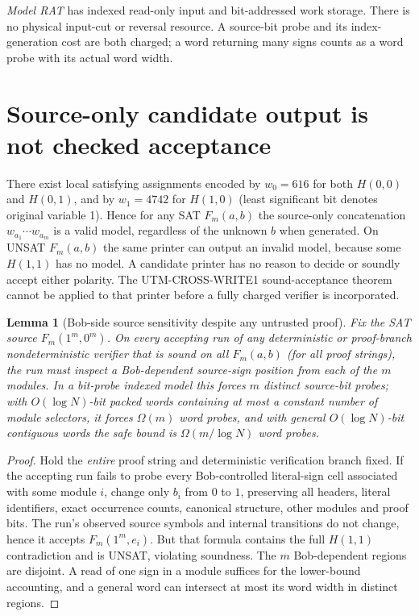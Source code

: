 \documentclass[11pt]{article}
\newtheorem{lemma}[theorem]{Lemma}
\begin{document}
\emph{Model RAT} has indexed read-only input and bit-addressed work storage. There is no physical input-cut or reversal resource. A source-bit probe and its index-generation cost are both charged; a word returning many signs counts as a word probe with its actual word width.

\section{Source-only candidate output is not checked acceptance}
There exist local satisfying assignments encoded by $w_0=616$ for both $H(0,0)$ and $H(0,1)$, and by $w_1=4742$ for $H(1,0)$ (least significant bit denotes original variable 1). Hence for any SAT $F_m(a,b)$ the source-only concatenation $w_{a_1}\cdots w_{a_m}$ is a valid model, regardless of the unknown $b$ when generated. On UNSAT $F_m(a,b)$ the same printer can output an invalid model, because some $H(1,1)$ has no model. A candidate printer has no reason to decide or soundly accept either polarity. The UTM-CROSS-WRITE1 sound-acceptance theorem cannot be applied to that printer before a fully charged verifier is incorporated.

\begin{lemma}[Bob-side source sensitivity despite any untrusted proof]\label{lem:bob}
Fix the SAT source $F_m(1^m,0^m)$. On \emph{every} accepting run of any deterministic or proof-branch nondeterministic verifier that is sound on all $F_m(a,b)$ (for all proof strings), the run must inspect a Bob-dependent source-sign position from each of the $m$ modules. In a bit-probe indexed model this forces $m$ distinct source-bit probes; with $O(\log N)$-bit packed words containing at most a constant number of module selectors, it forces $\Omega(m)$ word probes, and with general $O(\log N)$-bit contiguous words the safe bound is $\Omega(m/\log N)$ word probes.
\end{lemma}
\begin{proof}
Hold the \emph{entire} proof string and deterministic verification branch fixed. If the accepting run fails to probe every Bob-controlled literal-sign cell associated with some module $i$, change only $b_i$ from $0$ to $1$, preserving all headers, literal identifiers, exact occurrence counts, canonical structure, other modules and proof bits. The run's observed source symbols and internal transitions do not change, hence it accepts $F_m(1^m,e_i)$. But that formula contains the full $H(1,1)$ contradiction and is UNSAT, violating soundness. The $m$ Bob-dependent regions are disjoint. A read of one sign in a module suffices for the lower-bound accounting, and a general word can intersect at most its word width in distinct regions. \end{proof}
\end{document}
